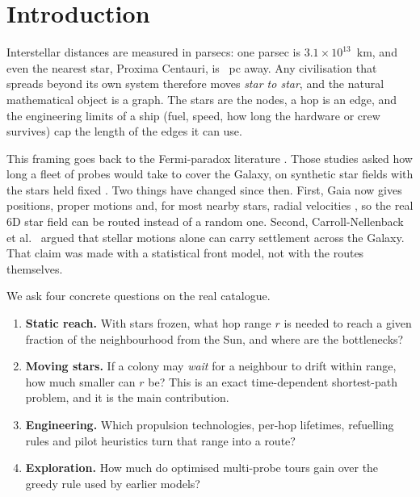 \section{Introduction}
\label{sec:intro}

Interstellar distances are measured in parsecs: one parsec is
$3.1\times10^{13}$~km, and even the nearest star, Proxima Centauri, is
\SunFirstHop~pc away. Any civilisation that spreads beyond its own system
therefore moves \emph{star to star}, and the natural mathematical object is a
graph. The stars are the nodes, a hop is an edge, and the engineering limits of
a ship (fuel, speed, how long the hardware or crew survives) cap the length of
the edges it can use.

This framing goes back to the Fermi-paradox literature
\cite{hart1975explanation,newman1981galactic}. Those studies asked how long a
fleet of probes would take to cover the Galaxy, on synthetic star fields with
the stars held fixed \cite{bjork2007exploring,cotta2009computational}. Two things
have changed since then. First, Gaia now gives positions, proper motions and,
for most nearby stars, radial velocities \cite{gaia2023dr3,smart2021gcns}, so
the real 6D star field can be routed instead of a random one. Second,
Carroll-Nellenback et al.\ \cite{carroll2019fermi} argued that stellar motions
alone can carry settlement across the Galaxy. That claim was made with a
statistical front model, not with the routes themselves.

We ask four concrete questions on the real catalogue.
\begin{enumerate}
\item \textbf{Static reach.} With stars frozen, what hop range $r$ is needed
to reach a given fraction of the neighbourhood from the Sun, and where are the
bottlenecks?
\item \textbf{Moving stars.} If a colony may \emph{wait} for a neighbour to
drift within range, how much smaller can $r$ be? This is an exact
time-dependent shortest-path problem, and it is the main contribution.
\item \textbf{Engineering.} Which propulsion technologies, per-hop lifetimes,
refuelling rules and pilot heuristics turn that range into a route?
\item \textbf{Exploration.} How much do optimised multi-probe tours gain over
the greedy rule used by earlier models?
\end{enumerate}

